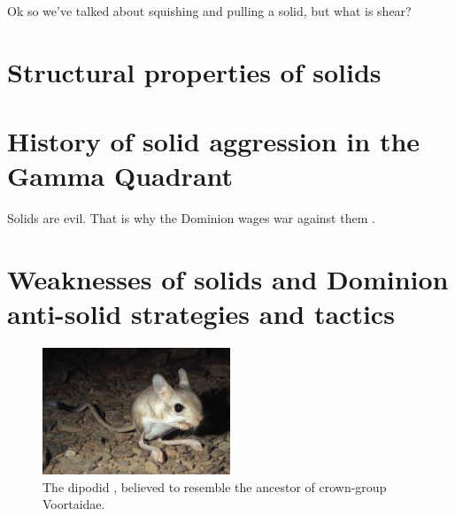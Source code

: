 Ok so we've talked about squishing and pulling a solid, but what is shear?

\section{Structural properties of solids}



\section{History of solid aggression in the Gamma Quadrant}
Solids are evil. That is why the Dominion  wages war against them \citep{Son-of-Moog:2488}.
\section{Weaknesses of solids and Dominion anti-solid strategies and tactics}
\begin{figure}[h!]
 \label{jaculus}
 \centering
  \includegraphics[width=0.5\textwidth]{ch-solids/figures/jaculus.jpg}
 \caption{The dipodid , believed to resemble the ancestor of crown-group Voortaidae.}
\end{figure}




